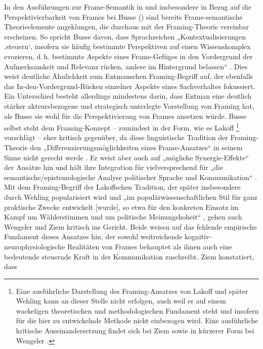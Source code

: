 In den Ausführungen zur Frame-Semantik in  und insbesondere in Bezug auf die Perspektivierbarkeit von Frames bei Busse () sind bereits Frame-semantische Theorieelemente angeklungen, die durchaus mit der Framing-Theorie vereinbar erscheinen. So spricht Busse davon, dass Sprachzeichen „Kontextualisierungen ‚steuern`, insofern sie häufig bestimmte Perspektiven auf einen Wissenskomplex evozieren, d.\,h. bestimmte Aspekte eines Frame-Gefüges in den Vordergrund der Aufmerksamkeit und Relevanz rücken, andere im Hintergrund belassen`` \autocite[664]{busseFrameSemantikKompendium2012}. Dies weist deutliche Ähnlichkeit zum Entmanschen Framing-Begriff auf, der ebenfalls das In-den-Vordergrund-Rücken einzelner Aspekte eines Sachverhaltes fokussiert. Ein Unterschied besteht allerdings mindestens darin, dass Entman eine deutlich stärker akteursbezogene und strategisch unterlegte Vorstellung von Framing hat, als Busse sie wohl für die Perspektivierung von Frames ansetzen würde. Busse selbst steht dem Framing-Konzept -- zumindest in der Form, wie es Lakoff \autocite*{lakoffDontThinkElephant2004}\footnote{Eine ausführliche Darstellung des Framing-Ansatzes von Lakoff und später Wehling kann an dieser Stelle nicht erfolgen, auch weil er auf einem wackeligen theoretischen und methodologischen Fundament steht und insofern für die hier zu entwickelnde Methode nicht einbezogen wird. Eine ausführliche kritische Auseinandersetzung findet sich bei Ziem \autocite*{ziemFramingGeneseStruktur2022} sowie in kürzerer Form bei Wengeler \autocite*{wengelerWarnungVorFraming2022}.} vorschlägt -- eher kritisch gegenüber, da diese linguistische Tradition der Framing-Theorie den „Differenzierungsmöglichkeiten eines Frame-Ansatzes`` in seinem Sinne nicht gerecht werde \autocite[218]{busse33LexikFrameanalytisch2017}. Er weist aber auch auf „mögliche Synergie-Effekte`` der Ansätze hin und hält ihre Integration für vielversprechend für „die semantische/epistemologische Analyse politischer Sprache und Kommunikation`` \autocite[218]{busse33LexikFrameanalytisch2017}. Mit dem Framing-Begriff der Lakoffschen Tradition, der später insbesondere durch Wehling \autocite*{wehlingPolitischesFramingWie2016} popularisiert wird und „im populärwissenschaftlichen Stil für ganz praktische Zwecke entwickelt {[}wurde{]}, so etwa für den konkreten Einsatz im Kampf um Wählerstimmen und um politische Meinungshoheit`` \autocite[74]{ziemFramingGeneseStruktur2022}, gehen auch Wengeler \autocite*{wengelerWarnungVorFraming2022} und Ziem \autocite*{ziemFramingGeneseStruktur2022} kritisch ins Gericht. Beide weisen auf das fehlende empirische Fundament dieses Ansatzes hin, der sowohl weitreichende kognitiv-neurophysiologische Realitäten von Frames behauptet als ihnen auch eine bedeutende steuernde Kraft in der Kommunikation zuschreibt. Ziem konstatiert, dass

